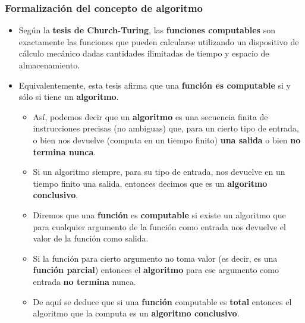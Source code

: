 \documentclass[xcolor=table]{beamer}
\begin{document}
\begin{frame}[fragile]\frametitle{Formalización del concepto de algoritmo} \footnotesize

\begin{itemize}
    \item Según la \textbf{tesis de Church-Turing}, las \textbf{funciones computables} son exactamente las funciones que pueden calcularse utilizando un dispositivo de cálculo mecánico dadas cantidades ilimitadas de tiempo y espacio de almacenamiento. 
    \item  Equivalentemente, esta tesis afirma que una \textbf{función es computable} si y sólo si tiene un \textbf{algoritmo}.

    \begin{itemize}\footnotesize
        \item Así, podemos decir que un \textbf{algoritmo} es una secuencia finita de instrucciones precisas (no ambiguas) que, para un cierto tipo de entrada, o bien nos devuelve (computa en un tiempo finito) \textbf{una salida} o bien \textbf{no termina nunca}.
        
        \item Si un algoritmo siempre, para su tipo de entrada, nos devuelve en un tiempo finito una salida, entonces decimos que es un \textbf{algoritmo conclusivo}.
        
        \item Diremos que una \textbf{función} es \textbf{computable} si existe un algoritmo que para cualquier argumento de la función como entrada nos devuelve el valor de la función como salida. 
        
        \item Si la función para cierto argumento no toma valor (es decir, es una \textbf{función parcial}) entonces el \textbf{algoritmo} para ese argumento como entrada \textbf{no termina} nunca.
        
        \item De aquí se deduce que si una \textbf{función} computable es \textbf{total} entonces el algoritmo que la computa es un \textbf{algoritmo conclusivo}.
    \end{itemize}
\end{itemize}
\end{frame}
\end{document}

